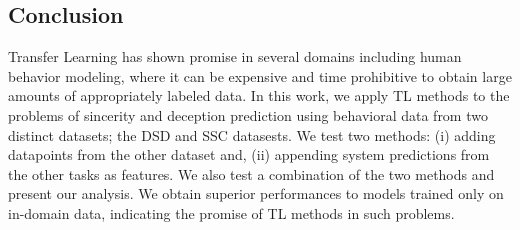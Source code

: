 \documentclass{article}
\begin{document}
\begin{spacing}{0.89}
%

\vspace{-3mm}
\section{Conclusion}
\vspace{-3mm}

Transfer Learning has shown promise in several domains including human behavior modeling, where it can be expensive and time prohibitive to obtain large amounts of appropriately labeled data.
In this work, we apply TL methods to the problems of sincerity and deception prediction using behavioral data from two distinct datasets; the DSD and SSC datasests. 
We test two methods: (i) adding datapoints from the other dataset and, (ii) appending system predictions from the other tasks as features. 
We also test a combination of the two methods and present our analysis.
We obtain superior performances to models trained only on in-domain data, indicating the promise of TL methods in such problems. 


\end{spacing}
\end{document}
